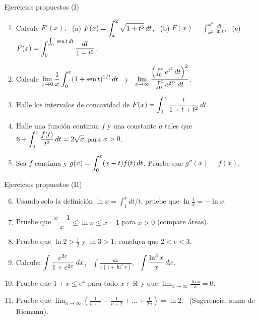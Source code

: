 \documentclass[10pt,aspectratio=169]{beamer}
\begin{document}
\begin{frame}{Ejercicios propuestos (I)}
  \begin{ejercicio}[: TFC1]
    \begin{enumerate}
      \item Calcule $F'(x)$: \ (a) $\displaystyle F(x)=\int_x^{2}\sqrt{1+t^3}\,dt$, \ (b) $\displaystyle F(x)=\int_{x^2}^{x^3}\frac{dt}{\ln t}$,
        \ (c) $\displaystyle F(x)=\int_0^{\int_0^x\operatorname{sen} t\,dt}\frac{dt}{1+t^2}$.
      \item Calcule $\displaystyle\lim_{x\to0}\frac{1}{x}\int_0^x(1+\operatorname{sen} t)^{1/t}\,dt$ \ y \
        $\displaystyle\lim_{x\to\infty}\frac{\left(\int_0^xe^{t^2}\,dt\right)^2}{\int_0^xe^{2t^2}\,dt}$.
      \item Halle los intervalos de concavidad de $\displaystyle F(x)=\int_0^x\frac{t}{1+t+t^2}\,dt$.
      \item Halle una función continua $f$ y una constante $a$ tales que $\displaystyle6+\int_a^x\frac{f(t)}{t^2}\,dt=2\sqrt x$ para $x>0$.
      \item Sea $f$ continua y $\displaystyle g(x)=\int_0^x(x-t)f(t)\,dt$. Pruebe que $g''(x)=f(x)$.
    \end{enumerate}
  \end{ejercicio}
\end{frame}

\begin{frame}{Ejercicios propuestos (II)}
  \begin{ejercicio}
    \begin{enumerate}
      \setcounter{enumi}{5}
      \item Usando solo la definición $\ln x=\int_1^x dt/t$, pruebe que $\ln\frac1x=-\ln x$.
      \item Pruebe que $\dfrac{x-1}{x}\le\ln x\le x-1$ para $x>0$ (compare áreas).
      \item Pruebe que $\ln2>\frac12$ y $\ln3>1$; concluya que $2<e<3$.
      \item Calcule: $\displaystyle\int\frac{e^{2x}}{1+e^{2x}}\,dx$, \ $\displaystyle\int\frac{dx}{x(1+\ln^2x)}$,
        \ $\displaystyle\int\frac{\ln^3x}{x}\,dx$.
      \item Pruebe que $1+x\le e^x$ para todo $x\in\mathbb{R}$ y que $\displaystyle\lim_{x\to\infty}\frac{\ln x}{x}=0$.
      \item Pruebe que $\displaystyle\lim_{n\to\infty}\left(\frac1{n+1}+\frac1{n+2}+\dots+\frac1{2n}\right)=\ln2$.
        \ \small(Sugerencia: suma de Riemann).
    \end{enumerate}
  \end{ejercicio}
\end{frame}
\end{document}
